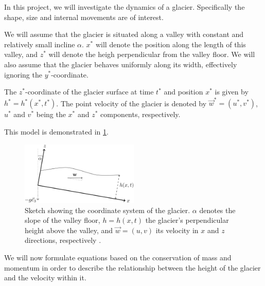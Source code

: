 In this project, we will investigate the dynamics of a glacier. Specifically the shape, size and internal movements are of interest.

We will assume that the glacier is situated along a valley with constant and relatively small incline $\alpha$. $x^*$ will denote the position along the length of this valley, and $z^*$ will denote the heigh perpendicular from the valley floor. We will also assume that the glacier behaves uniformly along its width, effectively ignoring the $y^*$-coordinate.

The $z^*$-coordinate of the glacier surface at time $t^*$ and position $x^*$ is given by $h^* = h^*(x^*, t^*)$. The point velocity of the glacier is denoted by $\vec{w}^* = (u^*, v^*)$, $u^*$ and $v^*$ being the $x^*$ and $z^*$ components, respectively.

This model is demonstrated in \figurename{ \ref{fig:coordinate_system}}.

\begin{figure}
  \centering
    \includegraphics[width=0.5\textwidth]{images/coordinate_system.png}
  \caption{Sketch showing the coordinate system of the glacier. $\alpha$ denotes the slope of the valley floor, $h = h(x, t)$ the glacier's perpendicular height above the valley, and $\vec{w} = (u, v)$ its velocity in $x$ and $z$ directions, respectively \cite{project-description}.}
  \label{fig:coordinate_system}
\end{figure}

We will now formulate equations based on the conservation of mass and momentum in order to describe the relationship between the height of the glacier and the velocity within it.
